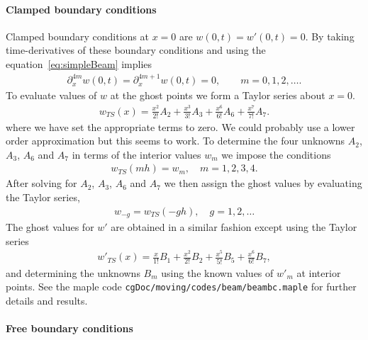 \documentclass[11pt]{article}
\begin{document}
\paragraph{Clamped boundary conditions}

Clamped boundary conditions at $x=0$ are $w(0,t)=w'(0,t)=0$. 
By taking time-derivatives of these boundary conditions and using the equation~\eqref{eq:simpleBeam}
implies
\begin{align}
     \partial_x^{4m}w(0,t) = \partial_x^{4m+1}w(0,t)=0, \qquad m=0,1,2,\ldots.
\end{align}
To evaluate values of $w$ at the ghost points we form a Taylor series about $x=0$. 
\begin{align}
     w_{TS}(x) =  \frac{x^2}{2!} A_2 + \frac{x^3}{3!} A_3 + \frac{x^6}{6!} A_6 + \frac{x^7}{7!} A_7 .
\end{align}
where we have set the appropriate terms to zero.
We could probably use a lower order approximation but this seems to work.
To determine the four unknowns $A_2$, $A_3$, $A_6$ and $A_7$ in terms of the interior values $w_m$
we impose the conditions
\begin{align}
     w_{TS}(m h) =  w_{m} , \quad m=1,2,3,4.
\end{align}
After solving for $A_2$, $A_3$, $A_6$ and $A_7$ we then assign the ghost values by evaluating the
Taylor series, 
\begin{align}
   w_{-g} =  w_{TS}(-g h) , \quad g=1,2,\ldots
\end{align}
%
The ghost values for $w'$ are obtained in a similar fashion except using the Taylor series
\begin{align}
     w'_{TS}(x) =  \frac{x}{1!} B_1 + \frac{x^2}{2!} B_2 + \frac{x^5}{5!} B_5 + \frac{x^6}{6!} B_7 ,
\end{align}
and determining the unknowns $B_m$ using the known values of $w'_m$ at interior points.
See the maple code {\tt cgDoc/moving/codes/beam/beambc.maple} for further details and results.

\paragraph{Free boundary conditions}
\end{document}
